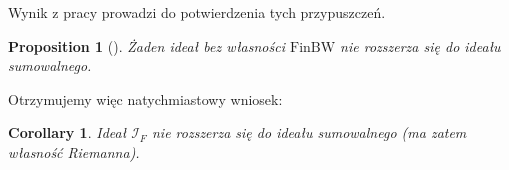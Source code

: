 \documentclass{amsart}
\newtheorem{prop}{Proposition}
\newtheorem{cor}{Corollary}
\theoremstyle{definition}
\theoremstyle{definition}
\newcommand{\I}{\mathcal I}
\newcommand{\finbw}{\text{FinBW}}
\begin{document}
Wynik z pracy \cite{H1} prowadzi do potwierdzenia tych przypuszczeń.
\begin{prop}[\cite{H1}]
Żaden ideał bez własności $\finbw$ nie rozszerza się do ideału sumowalnego.
\end{prop}

Otrzymujemy więc natychmiastowy wniosek:
\begin{cor}
Ideał $\I_F$ nie rozszerza się do ideału sumowalnego (ma zatem własność Riemanna).
\end{cor}




    \color{black}







\end{document}
